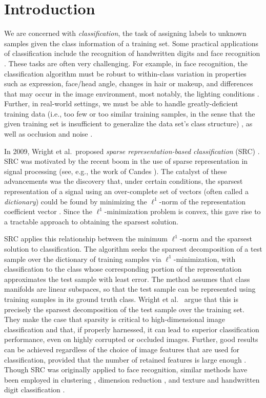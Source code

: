 \documentclass[review]{elsarticle}
\begin{document}
\section{Introduction}

We are concerned with \emph{classification}, the task of assigning labels to unknown samples given the class information of a training set. Some practical applications of classification include the recognition of handwritten digits \cite{lecun:mnist} and face recognition \cite{wri:src,cev:fr,sur:fr}. These tasks are often very challenging. For example, in face recognition, the classification algorithm must be robust to within-class variation in properties such as expression, face/head angle, changes in hair or makeup, and differences that may occur in the image environment, most notably, the lighting conditions \cite{sur:fr}. Further, in real-world settings, we must be able to handle greatly-deficient training data (i.e., too few or too similar training samples, in the sense that the given training set is insufficient to generalize the data set's class structure) \cite{ssfr:sur}, as well as occlusion and noise \cite{wri:src}. 

In 2009, Wright et al.\ proposed \emph{sparse representation-based classification} (SRC) \cite{wri:src}. SRC was motivated by the recent boom in the use of sparse representation in signal processing (see, e.g., the work of Candes \cite{can:spa}). The catalyst of these advancements was the discovery that, under certain conditions, the sparsest representation of a signal using an over-complete set of vectors (often called a \emph{dictionary}) could be found by minimizing the $\ell^1$-norm of the representation coefficient vector \cite{don:und}. Since the $\ell^1$-minimization problem is convex, this gave rise to a tractable approach to obtaining the sparsest solution. 

SRC applies this relationship between the minimum $\ell^1$-norm and the sparsest solution to classification. The algorithm seeks the sparsest decomposition of a test sample over the dictionary of training samples via $\ell^1$-minimization, with classification to the class whose corresponding portion of the representation approximates the test sample with least error. The method assumes that class manifolds are linear subspaces, so that the test sample can be represented using training samples in its ground truth class. Wright et al.\ \cite{wri:src} argue that this is precisely the sparsest decomposition of the test sample over the training set. They make the case that sparsity is critical to high-dimensional image classification and that, if properly harnessed, it can lead to superior classification performance, even on highly corrupted or occluded images. Further, good results can be achieved regardless of the choice of image features that are used for classification, provided that the number of retained features is large enough \cite{wri:src}. Though SRC was originally applied to face recognition, similar methods have been employed in clustering \cite{elh:ssc}, dimension reduction \cite{qiao:spp}, and texture and handwritten digit classification \cite{yan:sria}. 
\end{document}
